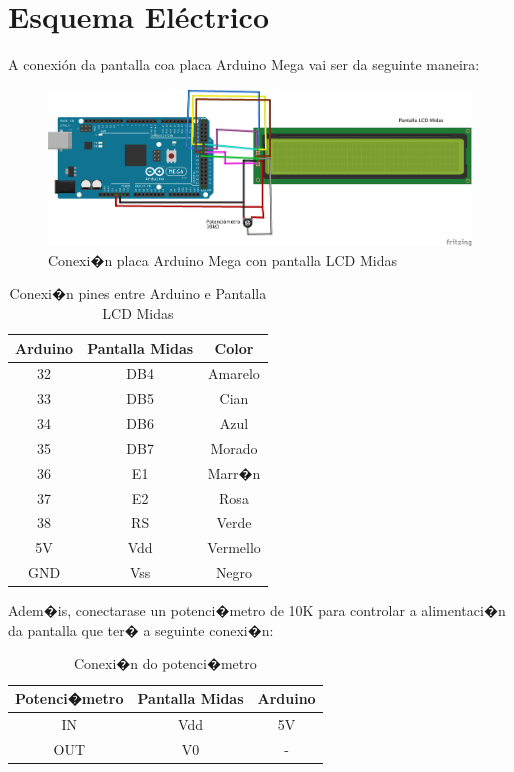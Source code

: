 \documentclass[11pt,twoside]{book}
\begin{document}
\section{Esquema Eléctrico}

A conexión da pantalla coa placa Arduino Mega vai ser da seguinte maneira:

\begin{figure}[H]
	\begin{center}
		\includegraphics[width=15cm]{images/conexionArduinoLCD.png}
	\end{center}
	\caption{Conexi�n placa Arduino Mega con pantalla LCD Midas}
	\label{fig:ConexionESP8266}
\end{figure}

\begin{table}[htbt]
\begin{center}
\begin{tabular}{|c|c|c|}
\hline
Arduino & Pantalla Midas & Color \\
\hline
32 & DB4 & Amarelo \\
\hline
33 & DB5 & Cian\\
\hline
34 & DB6 & Azul \\
\hline
35 & DB7 & Morado \\
\hline
36 & E1 & Marr�n \\
\hline
37 & E2 & Rosa \\
\hline
38 & RS & Verde \\
\hline
5V & Vdd & Vermello \\
\hline
GND & Vss & Negro \\
\hline
\end{tabular}
\caption{Conexi�n pines entre Arduino e Pantalla LCD Midas}
\label{TablaArduinoPantalla}
\end{center}
\end{table}

Adem�is, conectarase un potenci�metro de 10K para controlar a alimentaci�n da pantalla que ter� a seguinte conexi�n:

\begin{table}[htbt]
\begin{center}
\begin{tabular}{|c|c|c|}
\hline
Potenci�metro & Pantalla Midas & Arduino\\
\hline
IN & Vdd & 5V \\
\hline
OUT & V0 & -\\
\hline
\end{tabular}
\caption{Conexi�n do potenci�metro}
\label{TablaPotenciometro}
\end{center}
\end{table}
\end{document}
